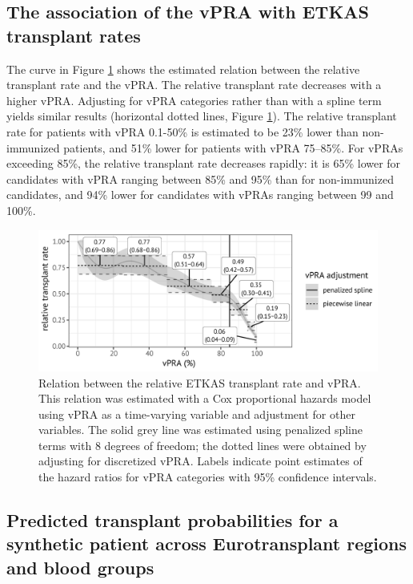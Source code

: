 \documentclass[11pt,twoside,]{book}
\begin{document}
\FloatBarrier

\subsection{The association of the vPRA with ETKAS transplant rates}\label{the-association-of-the-vpra-with-etkas-transplant-rates}

The curve in Figure \ref{fig:ch7fig1} shows the estimated relation between
the relative transplant rate and the vPRA. The relative transplant rate
decreases with a higher vPRA. Adjusting for vPRA categories rather than
with a spline term yields similar results (horizontal dotted lines,
Figure \ref{fig:ch7fig1}). The relative transplant rate for patients with vPRA
0.1-50\% is estimated to be 23\% lower than non-immunized patients, and
51\% lower for patients with vPRA 75--85\%. For vPRAs exceeding 85\%, the
relative transplant rate decreases rapidly: it is 65\% lower for candidates
with vPRA ranging between 85\% and 95\% than for non-immunized candidates, and 94\%
lower for candidates with vPRAs ranging between 99 and 100\%.

\begin{figure}[ht]

{\centering \includegraphics[width=1\linewidth]{figures/ch7//figure1} 

}

\caption{Relation between the relative ETKAS transplant rate and vPRA. This relation was estimated with a Cox proportional hazards model using vPRA as a time-varying variable and adjustment for other variables. The solid grey line was estimated using penalized spline terms with 8 degrees of freedom; the dotted lines were obtained by adjusting for discretized vPRA. Labels indicate point estimates of the hazard ratios for vPRA categories with 95\% confidence intervals.}\label{fig:ch7fig1}
\end{figure}

\subsection{Predicted transplant probabilities for a synthetic patient across Eurotransplant regions and blood groups}\label{predicted-transplant-probabilities-for-a-synthetic-patient-across-eurotransplant-regions-and-blood-groups}
\end{document}
